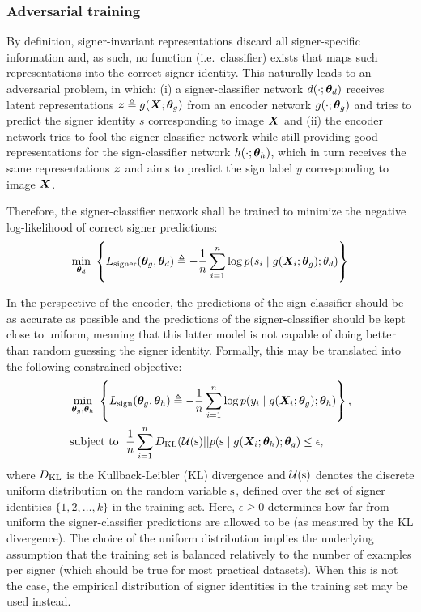 

\subsubsection{Adversarial training}
By definition, signer-invariant representations discard all signer-specific information and, as such, no function (i.e.\ classifier) exists that maps such representations into the correct signer identity. This naturally leads to an adversarial problem, in which: (i) a signer-classifier network $d(\cdot; {\bm{\theta}}_d)$ receives latent representations ${\bm{z}} \triangleq g({\bm{X}};{\bm{\theta}}_g)$ from an encoder network $g(\cdot;{\bm{\theta}}_g)$ and tries to predict the signer identity $s$ corresponding to image ${\bm{X}}$ and (ii) the encoder network tries to fool the signer-classifier network while still providing good representations for the sign-classifier network $h(\cdot; {\bm{\theta}}_h)$, which in turn receives the same representations ${\bm{z}}$ and aims to predict the sign label $y$ corresponding to image ${\bm{X}}$.

Therefore, the signer-classifier network shall be trained to minimize the negative log-likelihood of correct signer predictions:
\begin{equation}
\label{eq:signer_loss}
\min_{{\bm{\theta}}_d} \; \left\lbrace L_{\text{signer}}({\bm{\theta}}_g, {\bm{\theta}}_d) \triangleq -\frac{1}{n}\sum_{i=1}^n \log p(s_i \mid g({\bm{X}}_{i}; {\bm{\theta}}_g); \theta_d) \right\rbrace
\end{equation}

In the perspective of the encoder, the predictions of the sign-classifier should be as accurate as possible and the predictions of the signer-classifier should be kept close to uniform, meaning that this latter model is not capable of doing better than random guessing the signer identity. Formally, this may be translated into the following constrained objective:
\begin{align}
\label{eq:sign_loss}
&\min_{{\bm{\theta}}_g, {\bm{\theta}}_h} \; \left\lbrace L_{\text{sign}}({\bm{\theta}}_g, {\bm{\theta}}_h)\triangleq-\frac{1}{n}\sum_{i=1}^n \log p(y_i \mid g({\bm{X}}_{i}; {\bm{\theta}}_g); {\bm{\theta}}_h)\right\rbrace,\\
\label{eq:kl_obj}
&\text{subject to } \; \frac{1}{n}\sum_{i=1}^n D_{\mathrm{KL}}({\mathcal{U}}({\textnormal{s}}) || p({\textnormal{s}} \mid g({\bm{X}}_{i}; {\bm{\theta}}_h); {\bm{\theta}}_g) \leq \epsilon,
\end{align}
where $D_{\mathrm{KL}}$ is the Kullback-Leibler (KL) divergence and ${\mathcal{U}}({\textnormal{s}})$ denotes the discrete uniform distribution on the random variable ${\textnormal{s}}$, defined over the set of signer identities $\{1, 2, \dots, k\}$ in the training set. Here, $\epsilon \geq 0$ determines how far from uniform the signer-classifier predictions are allowed to be (as measured by the KL divergence). The choice of the uniform distribution implies the underlying assumption that the training set is balanced relatively to the number of examples per signer (which should be true for most practical datasets). When this is not the case, the empirical distribution of signer identities in the training set may be used instead.

